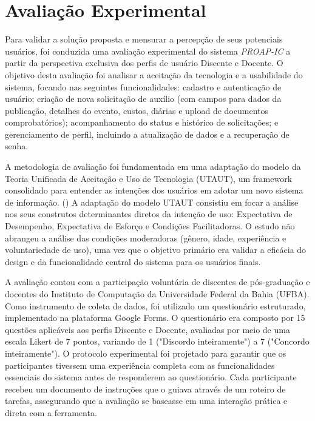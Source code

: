 \documentclass[portuguese]{sbc2025}%
\begin{document}

\section{Avaliação Experimental}
\label{sec:avaliacao}

Para validar a solução proposta e mensurar a percepção de seus potenciais usuários, foi conduzida uma avaliação experimental do sistema \textit{PROAP-IC} a partir da perspectiva exclusiva dos perfis de usuário Discente e Docente. O objetivo desta avaliação foi analisar a aceitação da tecnologia e a usabilidade do sistema, focando nas seguintes funcionalidades: cadastro e autenticação de usuário; criação de nova solicitação de auxílio (com campos para dados da publicação, detalhes do evento, custos, diárias e upload de documentos comprobatórios); acompanhamento do status e histórico de solicitações; e gerenciamento de perfil, incluindo a atualização de dados e a recuperação de senha.

A metodologia de avaliação foi fundamentada em uma adaptação do modelo da Teoria Unificada de Aceitação e Uso de Tecnologia (UTAUT), um framework consolidado para entender as intenções dos usuários em adotar um novo sistema de informação. (\cite{UTAUT}) A adaptação do modelo UTAUT consistiu em focar a análise nos seus construtos determinantes diretos da intenção de uso: Expectativa de Desempenho, Expectativa de Esforço e Condições Facilitadoras. O estudo não abrangeu a análise das condições moderadoras (gênero, idade, experiência e voluntariedade de uso), uma vez que o objetivo primário era validar a eficácia do design e da funcionalidade central do sistema para os usuários finais.

A avaliação contou com a participação voluntária de discentes de pós-graduação e docentes do Instituto de Computação da Universidade Federal da Bahia (UFBA). Como instrumento de coleta de dados, foi utilizado um questionário estruturado, implementado na plataforma Google Forms. O questionário era composto por 15 questões aplicáveis aos perfis Discente e Docente, avaliadas por meio de uma escala Likert de 7 pontos, variando de 1 ("Discordo inteiramente") a 7 ("Concordo inteiramente"). O protocolo experimental foi projetado para garantir que os participantes tivessem uma experiência completa com as funcionalidades essenciais do sistema antes de responderem ao questionário. Cada participante recebeu um documento de instruções que o guiava através de um roteiro de tarefas, assegurando que a avaliação se baseasse em uma interação prática e direta com a ferramenta.
\end{document}
